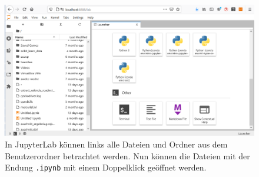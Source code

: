 \documentclass{tufte-handout}
\begin{document}
\begin{figure}[h]
  \includegraphics{jupyterlab-running}
  \caption{In JupyterLab können links alle Dateien und Ordner aus dem Benutzerordner betrachtet werden.
  Nun können die Dateien mit der Endung \texttt{.ipynb} mit einem Doppelklick geöffnet werden.
  }%
\label{fig:jupyterlab-running}
\end{figure}
\end{document}
